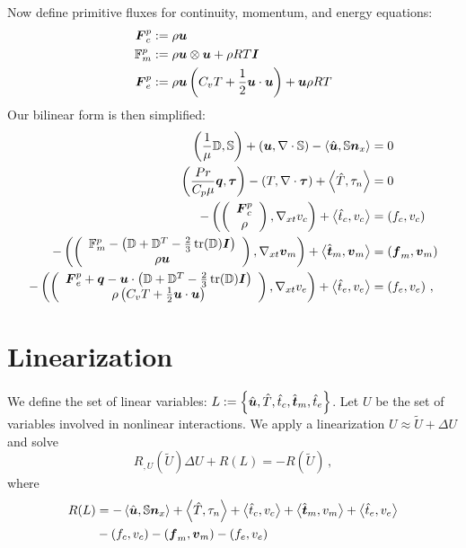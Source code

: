 \documentclass{article}
\begin{document}
Now define primitive fluxes for continuity, momentum, and energy equations:
\begin{align*}
\bfF^p_c&:=\rho\bfu\\
\mathbb{F}^p_m&:=\rho\bfu\otimes\bfu+\rho RT\bfI\\
\bfF^p_e&:=\rho\bfu\LRp{C_v T+\frac{1}{2}\bfu\cdot\bfu}+\bfu\rho RT
\end{align*}
Our bilinear form is then simplified:
\begin{subequations}
\label{eq:primitiveBF}
\begin{align}
	\LRp{\frac{1}{\mu}\mathbb{D},\mathbb{S}}+\LRp{\bfu,\Div\mathbb{S}}
	-\LRa{\hat\bfu,\mathbb{S}\bfn_x}&=0\\
	\LRp{\frac{Pr}{C_p\mu}\bfq,\bftau}-\LRp{T,\Div\bftau}+\LRa{\hat T,\tau_n}&=0\\
	-\LRp{\vecttwo{\bfF^p_c}{\rho},\Gradxt v_c}+\LRa{\hat t_c,v_c}&=\LRp{f_c,v_c}\\
	-\LRp{\vecttwo{\mathbb{F}^p_m-\LRp{\mathbb{D}+\mathbb{D}^T-\frac{2}{3}\trace(\mathbb{D})\bfI}}{\rho\bfu},\Gradxt\bfv_m}+\LRa{\hat\bft_m,\bfv_m}&=\LRp{\bff_m,\bfv_m}\\
	-\LRp{\vecttwo{\bfF^p_e+\bfq-\bfu\cdot\LRp{\mathbb{D}+\mathbb{D}^T-\frac{2}{3}\trace(\mathbb{D})\bfI}}{\rho\LRp{C_v T+\frac{1}{2}\bfu\cdot\bfu}},\Gradxt v_e}
	+\LRa{\hat t_e,v_e}&=\LRp{f_e,v_e}\,,
\end{align}
\end{subequations}


\section*{Linearization}
We define the set of linear variables: $L:=\LRc{\hat\bfu,\hat T,\hat t_c,\hat\bft_m,\hat t_e}$.
Let $U$ be the set of variables involved in nonlinear interactions.
We apply a linearization $U\approx\tilde U+\Delta U$ and solve
\begin{equation*}
	R_{,U}(\tilde U)\Delta U+R(L)=-R(\tilde U)\,,
\end{equation*}
where
\begin{align*}
R(L)&=
-\LRa{\hat\bfu,\mathbb{S}\bfn_x}
+\LRa{\hat T,\tau_n}
+\LRa{\hat t_c,v_c}
+\LRa{\hat \bft_m,v_m}
+\LRa{\hat t_e,v_e}\\
&-\LRp{f_c,v_c}
-\LRp{\bff_m,\bfv_m}
-\LRp{f_e,v_e}
\end{align*}
\end{document}
